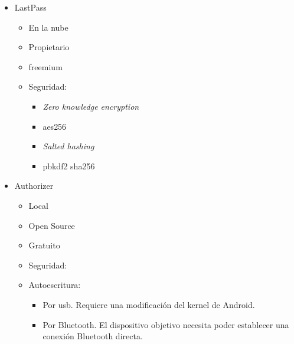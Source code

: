 \begin{itemize}
    \item LastPass
    \begin{itemize}
        \item En la nube
        \item Propietario
        \item \Gls{freemium}
        \item Seguridad: \cite{lastencryption}
        \begin{itemize}
            \item \textit{Zero knowledge encryption}
            \item \gls{aes}256
            \item \textit{Salted hashing}
            \item \gls{pbkdf}2 \gls{sha}256
        \end{itemize}
    \end{itemize}
    \item Authorizer \cite{authorizer}
    \begin{itemize}
        \item Local
        \item Open Source
        \item Gratuito
        \item Seguridad:
        \item Autoescritura:
        \begin{itemize}
            \item Por \gls{usb}. Requiere una modificación del kernel de Android.
            \item Por Bluetooth. El dispositivo objetivo necesita poder establecer una conexión Bluetooth directa.
        \end{itemize}
    \end{itemize}
    
\end{itemize}

